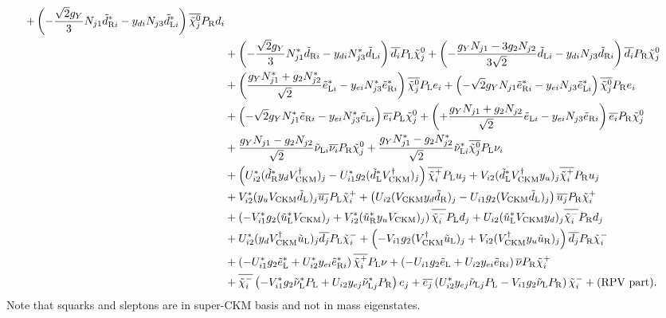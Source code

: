 \documentclass[CheatSheet]{subfiles}
\begin{document}
\begin{equation}
\begin{split}
   +  \left(-\frac{ \sqrt2g_Y}{3} N_{j1} \tdR[i]^*-\yd[i]N_{j3}\tdL[i]^* \right){\overline{\neut[j]}\PR d_i}
\\&+ \left(-\frac{ \sqrt2g_Y}{3} N_{j1}^* \tdR[i]-\yd[i]N_{j3}^*\tdL[i] \right){\overline{d_i}\PL \neut[j]}
   + \left(-\frac{g_Y N_{j1}-3g_2 N_{j2}}{3\sqrt{2}}\tdL[i]-\yd[i]N_{j3}\tdR[i]\right){\overline{d_i}\PR \neut[j]}
\\&+ \left(\frac{g_Y N_{j1}^*+ g_2 N_{j2}^*}{ \sqrt{2}}\teL[i]^{*}-\ye[i]N_{j3}^*\teR[i]^{*}\right){\overline{\neut[j]}\PL e_i}
   +  \left(-\sqrt{2}       g_Y   N_{j1} \teR[i]^*-\ye[i]N_{j3}\teL[i]^* \right){\overline{\neut[j]}\PR e_i}
\\&+ \left(-\sqrt{2}       g_Y   N_{j1}^*\teR[i]-\ye[i]N_{j3}^*\teL[i] \right){\overline{e_i}\PL \neut[j]}
   +  \left(+\frac{g_Y N_{j1}+ g_2 N_{j2}}{ \sqrt{2}}\teL[i]-\ye[i]N_{j3}\teR[i]\right){\overline{e_i}\PR\neut[j]}
\\&+ \frac{g_Y N_{j1}  -g_2 N_{j2}}  {\sqrt{2}}\tnuL[i]\overline{\nu_i}\PR\neut[j]
   +  \frac{g_Y N_{j1}^*-g_2 N_{j2}^*}{\sqrt{2}}\tnuL[i]^{*}{\overline{\neut[j]}\PL \nu_i}
\\&+ \left(U_{i2}^* (\tdR^{*}\yd V\w{CKM}^\dagger)_j - U_{i1}^* g_2 (\tdL^{*}V\w{CKM}^\dagger)_j \right)\overline{\charP[i]}\PL u_j
   + V_{i2} (\tdL^*V\w{CKM}^\dagger\yu)_j  \overline{\charP[i]}\PR u_j
\\&+ V_{i2}^* (\yu V\w{CKM}\tdL)_j             \overline{u_j}\PL\charP[i]
   + \left(U_{i2} (V\w{CKM}\yd\tdR)_j - U_{i1} g_2 (V\w{CKM}\tdL)_j \right)\overline{u_j}\PR \charP[i]
\\&+\left(- V_{i1}^* g_2 (\tuL^{*}V\w{CKM})_j + V_{i2}^* (\tuR^{*}\yu V\w{CKM})_j \right) \overline{\charM[i]}\PL d_j
   + U_{i2} (\tuL^*V\w{CKM}\yd)_j          \overline{\charM[i]}\PR d_j
\\&+ U_{i2}^* (\yd V\w{CKM}^\dagger \tuL)_j    \overline{d_j}\PL\charM[i]
   +\left(- V_{i1} g_2 (V\w{CKM}^\dagger\tuL)_j + V_{i2} (V\w{CKM}^\dagger \yu \tuR)_j \right) \overline{d_j}\PR\charM[i]
\\&+\left(- U_{i1}^* g_2 \teL^{*}             + U_{i2}^* \ye[i]\teR[i]^{*}        \right) \overline{\charP[i]}\PL \nu
   +\left(- U_{i1} g_2 \teL             + U_{i2} \ye[i]\teR[i]        \right) \overline{\nu}\PR \charP[i]
\\&+ \overline{\charM[i]}\left(- V_{i1}^* g_2 \tnuL^{*}\PL+ U_{i2} \ye[j]\tnuL[j]^*\PR    \right)  e_j
   + \overline{e_j}\left(U_{i2}^* \ye[j]\tnuL[j]    \PL - V_{i1} g_2 \tnuL \PR\right)\charM[i]
+\text{(RPV part)}.
\end{split}
\end{equation}
Note that squarks and sleptons are in super-CKM basis and not in mass eigenstates.
\end{document}
